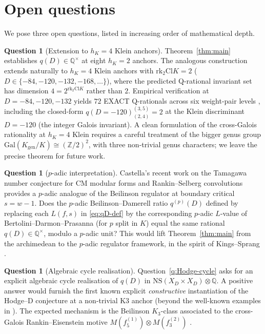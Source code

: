 \documentclass[11pt,a4paper]{amsart}
\theoremstyle{plain}
\theoremstyle{definition}
\newtheorem{question}[theorem]{Question}
\newcommand{\Q}{\mathbb{Q}}
\newcommand{\Z}{\mathbb{Z}}
\newcommand{\Gal}{\mathrm{Gal}}
\newcommand{\Cl}{\mathrm{Cl}}
\newcommand{\rkk}{\mathrm{rk}}
\newcommand{\Kgen}{K_{\mathrm{gen}}}
\begin{document}
\section{Open questions}\label{sec:open}

We pose three open questions, listed in increasing order of
mathematical depth.

\begin{question}[Extension to $h_K = 4$ Klein anchors]\label{q:hK4}
Theorem~\ref{thm:main} establishes $q(D) \in \Q^\times$ at eight
$h_K = 2$ anchors. The analogous construction extends naturally to
$h_K = 4$ Klein anchors with $\rkk_2 \Cl K = 2$
($D \in \{-84, -120, -132, -168, \ldots\}$), where the predicted
Q-rational invariant set has dimension $4 = 2^{\rkk_2 \Cl K}$ rather
than $2$. Empirical verification at $D = -84, -120, -132$
yields $72$ EXACT Q-rationals across six weight-pair levels
\cite[\S M.B.2]{BIGTABLE_V2}, including the closed-form
$q(D=-120)_{(2,4)}^{(3,5)} = 2$ at the Klein discriminant
$D = -120$ (the integer Galois invariant).
A clean formulation of the cross-Galois rationality at $h_K = 4$ Klein
requires a careful treatment of the bigger genus group
$\Gal(\Kgen/K) \cong (\Z/2)^2$, with three non-trivial genus
characters; we leave the precise theorem for future work.
\end{question}

\begin{question}[$p$-adic interpretation]\label{q:padic}
Castella's recent work on the Tamagawa number conjecture for CM
modular forms and Rankin--Selberg convolutions \cite{Castella2024}
provides a $p$-adic analogue of the Beilinson regulator at boundary
critical $s = w - 1$. Does the $p$-adic
Beilinson--Damerell ratio $q^{(p)}(D)$ defined by replacing each
$L(f, s)$ in \eqref{eq:qD-def} by the corresponding $p$-adic $L$-value
of Bertolini--Darmon--Prasanna \cite{BDP2013} (for $p$ split in $K$)
equal the same rational $q(D) \in \Q^\times$, modulo a $p$-adic unit?
This would lift Theorem~\ref{thm:main} from the archimedean to the
$p$-adic regulator framework, in the spirit of
Kings--Sprang \cite{KingsSprang2025}.
\end{question}

\begin{question}[Algebraic cycle realisation]\label{q:cycle-realisation}
Question~\ref{q:Hodge-cycle} asks for an explicit algebraic cycle
realisation of $q(D)$ in $\mathrm{NS}(X_D \times X_D) \otimes \Q$. A
positive answer would furnish the first known explicit
\emph{constructive} instantiation of the Hodge--D conjecture at a
non-trivial K3 anchor (beyond the well-known examples in
\cite{ChenLewis2007}). The expected mechanism is the Beilinson
$K_3$-class associated to the cross-Galois Rankin--Eisenstein motive
$M(f_5^{(1)}) \otimes M(f_3^{(2)})$
\cite[\S 3]{BrunaultChida2015}.
\end{question}
\end{document}
